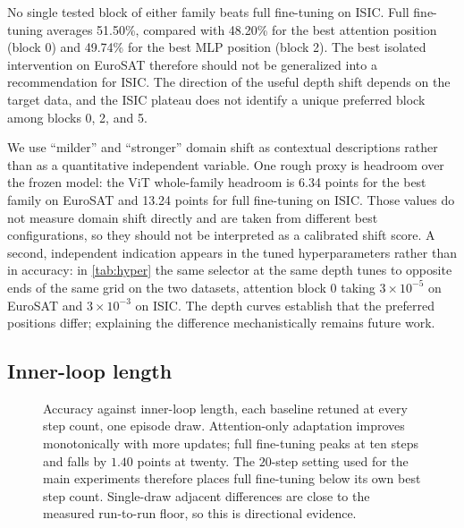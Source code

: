 \documentclass[11pt]{article}
\begin{document}
No single tested block of either family beats full fine-tuning on ISIC. Full fine-tuning averages 51.50\%, compared with 48.20\% for the best attention position (block 0) and 49.74\% for the best MLP position (block 2). The best isolated intervention on EuroSAT therefore should not be generalized into a recommendation for ISIC. The direction of the useful depth shift depends on the target data, and the ISIC plateau does not identify a unique preferred block among blocks 0, 2, and 5.

We use “milder” and “stronger” domain shift as contextual descriptions rather than as a quantitative independent variable. One rough proxy is headroom over the frozen model: the ViT whole-family headroom is 6.34 points for the best family on EuroSAT and 13.24 points for full fine-tuning on ISIC. Those values do not measure domain shift directly and are taken from different best configurations, so they should not be interpreted as a calibrated shift score. A second, independent indication appears in the tuned hyperparameters rather than in accuracy: in \cref{tab:hyper} the same selector at the same depth tunes to opposite ends of the same grid on the two datasets, attention block 0 taking $3\times10^{-5}$ on EuroSAT and $3\times10^{-3}$ on ISIC. The depth curves establish that the preferred positions differ; explaining the difference mechanistically remains future work.

\subsection{Inner-loop length}

\begin{figure}[t]
\centering
{}
\caption{Accuracy against inner-loop length, each baseline retuned at every step
count, one episode draw. Attention-only adaptation improves monotonically with
more updates; full fine-tuning peaks at ten steps and falls by $1.40$ points at
twenty. The $20$-step setting used for the main experiments therefore places
full fine-tuning below its own best step count. Single-draw adjacent differences
are close to the measured run-to-run floor, so this is directional evidence.}
\label{fig:steps}
\end{figure}
\end{document}
